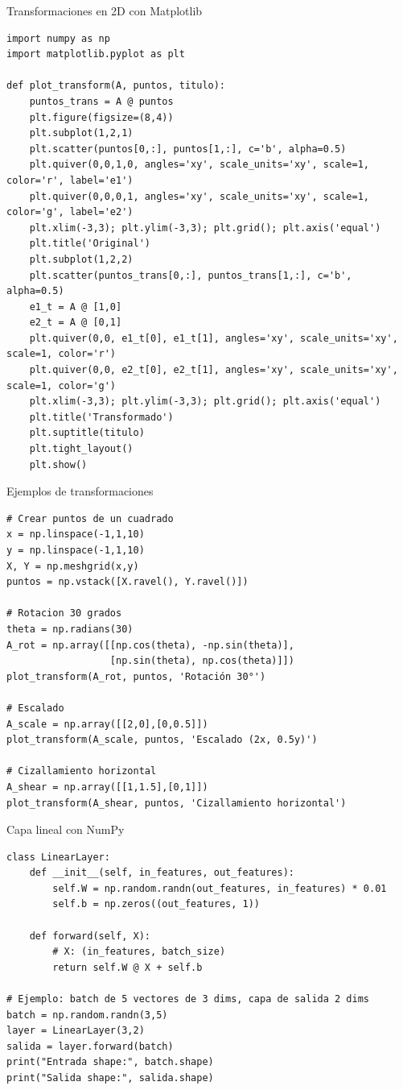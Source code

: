 \documentclass[aspectratio=169, 10pt, xcolor=table]{beamer}
\begin{document}
\begin{frame}[fragile]{Transformaciones en 2D con Matplotlib}
    \begin{lstlisting}
import numpy as np
import matplotlib.pyplot as plt

def plot_transform(A, puntos, titulo):
    puntos_trans = A @ puntos
    plt.figure(figsize=(8,4))
    plt.subplot(1,2,1)
    plt.scatter(puntos[0,:], puntos[1,:], c='b', alpha=0.5)
    plt.quiver(0,0,1,0, angles='xy', scale_units='xy', scale=1, color='r', label='e1')
    plt.quiver(0,0,0,1, angles='xy', scale_units='xy', scale=1, color='g', label='e2')
    plt.xlim(-3,3); plt.ylim(-3,3); plt.grid(); plt.axis('equal')
    plt.title('Original')
    plt.subplot(1,2,2)
    plt.scatter(puntos_trans[0,:], puntos_trans[1,:], c='b', alpha=0.5)
    e1_t = A @ [1,0]
    e2_t = A @ [0,1]
    plt.quiver(0,0, e1_t[0], e1_t[1], angles='xy', scale_units='xy', scale=1, color='r')
    plt.quiver(0,0, e2_t[0], e2_t[1], angles='xy', scale_units='xy', scale=1, color='g')
    plt.xlim(-3,3); plt.ylim(-3,3); plt.grid(); plt.axis('equal')
    plt.title('Transformado')
    plt.suptitle(titulo)
    plt.tight_layout()
    plt.show()
    \end{lstlisting}
\end{frame}

\begin{frame}[fragile]{Ejemplos de transformaciones}
    \begin{lstlisting}
# Crear puntos de un cuadrado
x = np.linspace(-1,1,10)
y = np.linspace(-1,1,10)
X, Y = np.meshgrid(x,y)
puntos = np.vstack([X.ravel(), Y.ravel()])

# Rotacion 30 grados
theta = np.radians(30)
A_rot = np.array([[np.cos(theta), -np.sin(theta)],
                  [np.sin(theta), np.cos(theta)]])
plot_transform(A_rot, puntos, 'Rotación 30°')

# Escalado
A_scale = np.array([[2,0],[0,0.5]])
plot_transform(A_scale, puntos, 'Escalado (2x, 0.5y)')

# Cizallamiento horizontal
A_shear = np.array([[1,1.5],[0,1]])
plot_transform(A_shear, puntos, 'Cizallamiento horizontal')
    \end{lstlisting}
\end{frame}

\begin{frame}[fragile]{Capa lineal con NumPy}
    \begin{lstlisting}
class LinearLayer:
    def __init__(self, in_features, out_features):
        self.W = np.random.randn(out_features, in_features) * 0.01
        self.b = np.zeros((out_features, 1))

    def forward(self, X):
        # X: (in_features, batch_size)
        return self.W @ X + self.b

# Ejemplo: batch de 5 vectores de 3 dims, capa de salida 2 dims
batch = np.random.randn(3,5)
layer = LinearLayer(3,2)
salida = layer.forward(batch)
print("Entrada shape:", batch.shape)
print("Salida shape:", salida.shape)
    \end{lstlisting}
\end{frame}
\end{document}
